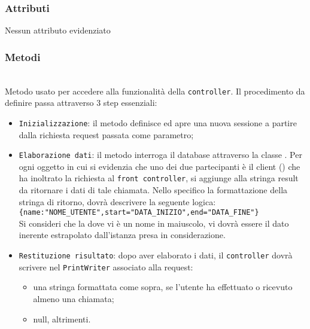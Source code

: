 \subsubsection*{Attributi}

Nessun attributo evidenziato

\subsubsection*{Metodi}
\begin{description}
	
	\item{}\\
	Metodo usato per accedere alla funzionalità della \texttt{controller}. Il procedimento da definire passa attraverso 3 step essenziali:
	\begin{itemize}
		\item \texttt{Inizializzazione}: il metodo definisce ed apre una nuova sessione a partire dalla richiesta request passata come parametro;
		\item \texttt{Elaborazione dati}: il metodo interroga il database attraverso la classe . Per ogni oggetto  in cui si evidenzia che uno dei due partecipanti è il client () che ha inoltrato la richiesta al \texttt{front controller}, si aggiunge alla stringa result da ritornare i dati di tale chiamata. Nello specifico la formattazione della stringa di ritorno, dovrà descrivere la seguente logica:\\
		
		\verb|{name:"NOME_UTENTE",start="DATA_INIZIO",end="DATA_FINE"}|\\
		
		Si consideri che la dove vi è un nome in maiuscolo, vi dovrà essere il dato inerente estrapolato dall'istanza  presa in considerazione.
		\item \texttt{Restituzione risultato}: dopo aver elaborato i dati, il \texttt{controller} dovrà scrivere nel \texttt{PrintWriter} associato alla request:
			\begin{itemize}
				\item una stringa formattata come sopra, se l'utente ha effettuato o ricevuto almeno una chiamata;
				\item null, altrimenti.
			\end{itemize}
	\end{itemize}

\end{description}

